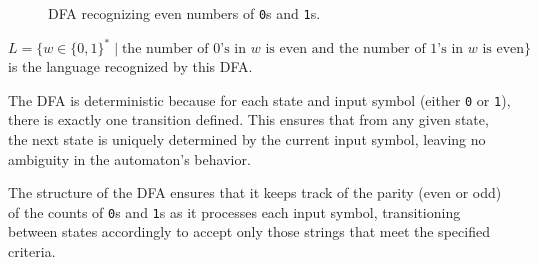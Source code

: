 \begin{figure}[h]
    \centering  
    \caption{DFA recognizing even numbers of \texttt{0}s and \texttt{1}s.}
    \label{fig:dfa-example}
\end{figure}

\(
L = \{ w \in \{0, 1\}^* \mid \text{the number of } 0\text{'s in } w \text{ is even and the number of } 1\text{'s in } w \text{ is even} \}
\) is the language recognized by this DFA.

The DFA is deterministic because for each state and input symbol (either \texttt{0} or \texttt{1}), there is exactly one transition defined. This ensures that from any given state, the next state is uniquely determined by the current input symbol, leaving no ambiguity in the automaton's behavior.

The structure of the DFA ensures that it keeps track of the parity (even or odd) of the counts of \texttt{0}s and \texttt{1}s as it processes each input symbol, transitioning between states accordingly to accept only those strings that meet the specified criteria.
